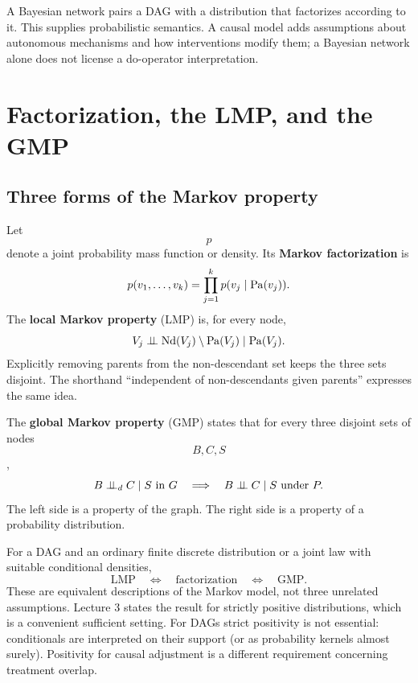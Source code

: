 A Bayesian network pairs a DAG with a distribution that factorizes according to it. This supplies probabilistic semantics. A causal model adds assumptions about autonomous mechanisms and how interventions modify them; a Bayesian network alone does not license a do-operator interpretation.

\section{Factorization, the LMP, and the GMP}
\subsection{Three forms of the Markov property}
Let $$p$$ denote a joint probability mass function or density. Its \textbf{Markov factorization} is
\begin{equation}\label{eq:factor}
p(v_1,\ldots,v_k)=\prod_{j=1}^k p(v_j\mid\operatorname{Pa}(v_j)).
\end{equation}
The \textbf{local Markov property} (LMP) is, for every node,
\begin{equation}\label{eq:lmp}
V_j\mathrel{\perp\!\!\!\perp} \operatorname{Nd}(V_j)\setminus\operatorname{Pa}(V_j)\mid\operatorname{Pa}(V_j).
\end{equation}
Explicitly removing parents from the non-descendant set keeps the three sets disjoint. The shorthand ``independent of non-descendants given parents'' expresses the same idea.

The \textbf{global Markov property} (GMP) states that for every three disjoint sets of nodes $$B,C,S$$,
\begin{equation}\label{eq:gmp}
B\mathrel{\perp\!\!\!\perp}_{d} C\mid S\text{ in }G\quad\Longrightarrow\quad B\mathrel{\perp\!\!\!\perp} C\mid S\text{ under }P.
\end{equation}
The left side is a property of the graph. The right side is a property of a probability distribution.
\begin{supplement}
For a DAG and an ordinary finite discrete distribution or a joint law with suitable conditional densities,
\begin{equation}
\boxed{\text{LMP}\quad\Longleftrightarrow\quad\text{factorization}\quad\Longleftrightarrow\quad\text{GMP}.}
\end{equation}
These are equivalent descriptions of the Markov model, not three unrelated assumptions. Lecture 3 states the result for strictly positive distributions, which is a convenient sufficient setting. For DAGs strict positivity is not essential: conditionals are interpreted on their support (or as probability kernels almost surely). Positivity for causal adjustment is a different requirement concerning treatment overlap.
\end{supplement}
